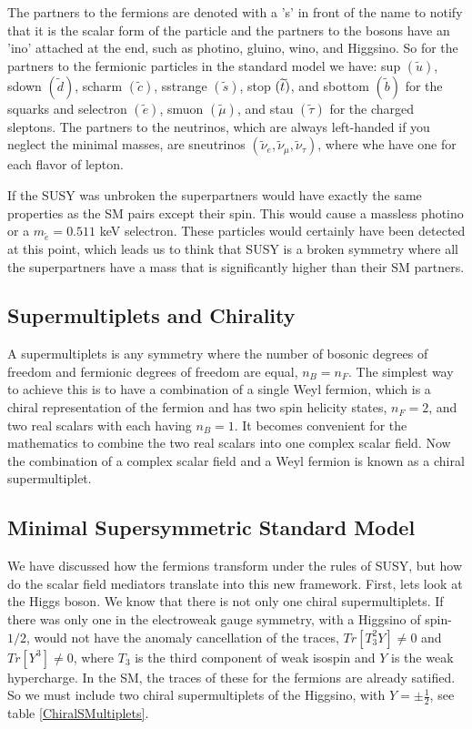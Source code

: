 The partners to the fermions are denoted with a 's' in front of the name to notify that it is the scalar form of the particle and the partners to the bosons have an 'ino' attached at the end, such as photino, gluino, wino, and Higgsino. So for the partners to the fermionic particles in the standard model we have: sup $(\widetilde{u})$, sdown $(\widetilde{d})$, scharm $(\widetilde{c})$, sstrange $(\widetilde{s})$, stop $(\widetilde{t})$, and sbottom $(\widetilde{b})$ for the squarks and selectron $(\widetilde{e})$, smuon $(\widetilde{\mu})$, and stau $(\widetilde{\tau})$ for the charged sleptons. The partners to the neutrinos, which are always left-handed if you neglect the minimal masses, are sneutrinos $(\widetilde{\nu}_e, \widetilde{\nu}_\mu, \widetilde{\nu}_\tau)$, where whe have one for each flavor of lepton. 

If the SUSY was unbroken the superpartners would have exactly the same properties as the SM pairs except their spin. This would cause a massless photino or a $m_{\widetilde{e}}=0.511$ keV selectron. These particles would certainly have been detected at this point, which leads us to think that SUSY is a broken symmetry where all the superpartners have a mass that is significantly higher than their SM partners. 

\subsection{Supermultiplets and Chirality}
\label{subsec:chiral}

A supermultiplets is any symmetry where the number of bosonic degrees of freedom and fermionic degrees of freedom are equal, $n_B=n_F$. The simplest  way to achieve this is to have a combination of a single Weyl fermion, which is a chiral representation of the fermion and has two spin helicity states, $n_F=2$, and two real scalars with each having $n_B=1$. It becomes convenient for the mathematics to combine the two real scalars into one complex scalar field. Now the combination of a complex scalar field and a Weyl fermion is known as a chiral supermultiplet. 

\subsection{Minimal Supersymmetric Standard Model}
\label{sec:MSSM}

We have discussed how the fermions transform under the rules of SUSY, but how do the scalar field mediators translate into this new framework. First, lets look at the Higgs boson. We know that there is not only one chiral supermultiplets. If there was only one in the electroweak gauge symmetry, with a Higgsino of spin-$1/2$, would not have the anomaly cancellation of the traces, $Tr[T^2_3Y]\neq0$ and $Tr[Y^3]\neq0$, where $T_3$ is the third component of weak isospin and $Y$ is the weak hypercharge. In the SM, the traces of these for the fermions are already satified. So we must include two chiral supermultiplets of the Higgsino, with $Y=\pm\frac{1}{2}$, see table \ref{ChiralSMultiplets}. 

